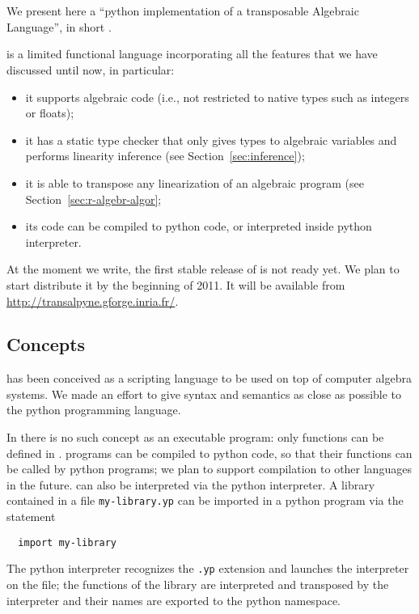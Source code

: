 \section{\tALpy{}}
\label{sec:texttttransalpyne}

\lstset{language=python}

We present here a ``python implementation of a transposable Algebraic
Language'', in short \tALpy{}.

\tALpy{} is a limited functional language incorporating all the
features that we have discussed until now, in particular:
\begin{itemize}
\item it supports algebraic code (i.e., not restricted to native types
  such as integers or floats);
\item it has a static type checker that only gives types to algebraic
  variables and performs linearity inference (see
  Section~\ref{sec:inference});
\item it is able to transpose any linearization of an algebraic
  program (see Section~\ref{sec:r-algebr-algor};
\item its code can be compiled to python code, or interpreted inside
  python interpreter.
\end{itemize}

At the moment we write, the first stable release of \tALpy{} is not
ready yet. We plan to start distribute it by the beginning of 2011. It
will be available from \url{http://transalpyne.gforge.inria.fr/}.


\subsection{Concepts}
\tALpy{} has been conceived as a scripting language to be used on top
of computer algebra systems. We made an effort to give syntax and
semantics as close as possible to the python programming language.

In \tALpy{} there is no such concept as an executable program: only
functions can be defined in \tALpy{}.  \tALpy{} programs can be
compiled to python code, so that their functions can be called by
python programs; we plan to support compilation to other languages in
the future. \tALpy{} can also be interpreted via the python
interpreter. A \tALpy{} library contained in a file
\texttt{my-library.yp} can be imported in a python program via the
statement
\begin{lstlisting}
  import my-library
\end{lstlisting}
The python interpreter recognizes the \texttt{.yp} extension and
launches the \tALpy{} interpreter on the file; the functions of the
library are interpreted and transposed by the \tALpy{} interpreter and
their names are exported to the python namespace.

